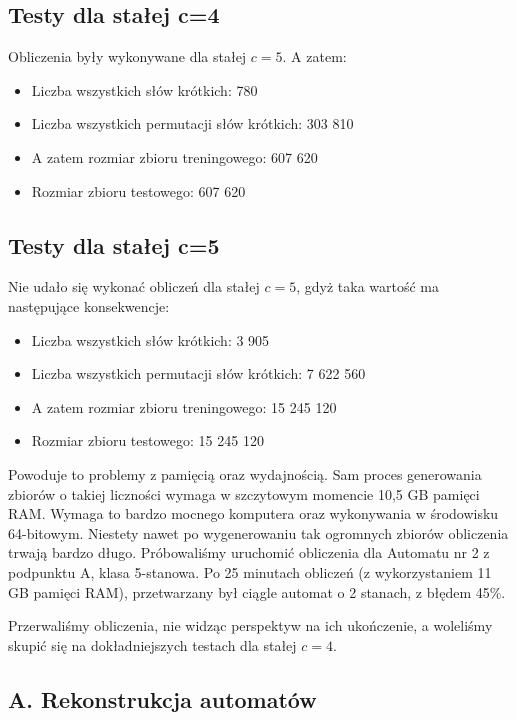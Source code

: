 \documentclass{../llncs_template_final/llncs}
\begin{document}
\subsection{Testy dla stałej c=4}
Obliczenia były wykonywane dla stałej $c = 5$. A zatem:
\begin{itemize}
\item Liczba wszystkich słów krótkich: 780
\item Liczba wszystkich permutacji słów krótkich: 303 810
\item A zatem rozmiar zbioru treningowego: 607 620
\item Rozmiar zbioru testowego: 607 620
\end{itemize}


\subsection{Testy dla stałej c=5}
Nie udało się wykonać obliczeń dla stałej $c = 5$, gdyż taka wartość ma następujące konsekwencje:
\begin{itemize}
\item Liczba wszystkich słów krótkich: 3 905
\item Liczba wszystkich permutacji słów krótkich: 7 622 560
\item A zatem rozmiar zbioru treningowego: 15 245 120
\item Rozmiar zbioru testowego: 15 245 120
\end{itemize}

Powoduje to problemy z pamięcią oraz wydajnością. Sam proces generowania zbiorów o takiej liczności wymaga w szczytowym momencie 10,5 GB pamięci RAM. Wymaga to bardzo mocnego komputera oraz wykonywania w środowisku 64-bitowym.
Niestety nawet po wygenerowaniu tak ogromnych zbiorów obliczenia trwają bardzo długo. Próbowaliśmy uruchomić obliczenia dla Automatu nr 2 z podpunktu A, klasa 5-stanowa. Po 25 minutach obliczeń (z wykorzystaniem 11 GB pamięci RAM), przetwarzany był ciągle automat o 2 stanach, z błędem 45\%. 

Przerwaliśmy obliczenia, nie widząc perspektyw na ich ukończenie, a woleliśmy skupić się na dokładniejszych testach dla stałej $c = 4$.

\newpage
\subsection{A. Rekonstrukcja automatów}
\end{document}
